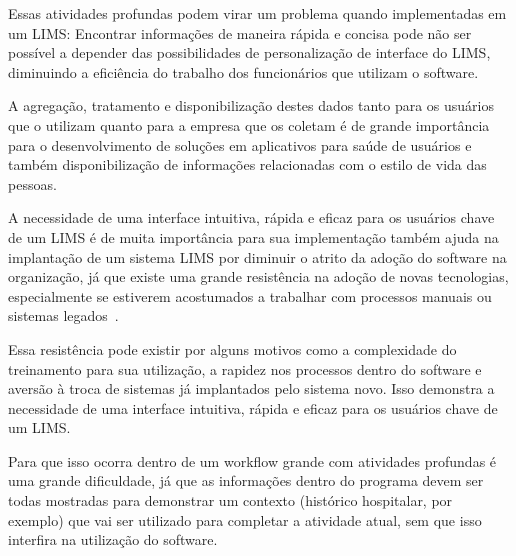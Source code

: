 
Essas atividades profundas podem virar um problema quando implementadas em um LIMS: Encontrar informações de maneira rápida e concisa pode não ser possível a depender das possibilidades de personalização de interface do LIMS, diminuindo a eficiência do trabalho dos funcionários que utilizam o software.




A agregação, tratamento e disponibilização destes dados tanto para os usuários que o utilizam quanto para a empresa que os coletam é de grande importância para o desenvolvimento de soluções em aplicativos para saúde de usuários e também disponibilização de informações relacionadas com o estilo de vida das pessoas.


A necessidade de uma interface intuitiva, rápida e eficaz para os usuários chave de um LIMS é de muita importância para sua implementação também ajuda na implantação de um sistema LIMS por diminuir o atrito da adoção do software na organização, já que existe uma grande resistência na adoção de novas tecnologias, especialmente se estiverem acostumados a trabalhar com processos manuais ou sistemas legados~\cite{2018CommonAstrix}.

Essa resistência pode existir por alguns motivos como a complexidade do treinamento para sua utilização,  a rapidez nos processos dentro do software e aversão à troca de sistemas já implantados pelo sistema novo. Isso demonstra a necessidade de uma interface intuitiva, rápida e eficaz para os usuários chave de um LIMS.

Para que isso ocorra dentro de um workflow grande com atividades profundas é uma grande dificuldade, já que as informações dentro do programa devem ser todas mostradas para demonstrar um contexto (histórico hospitalar, por exemplo) que vai ser utilizado para completar a atividade atual, sem que isso interfira na utilização do software.

